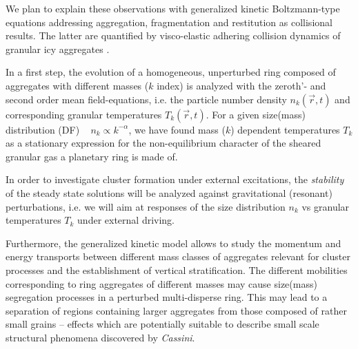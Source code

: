 \documentclass[11pt, notitlepage]{article} %
\begin{document}
We plan to explain these observations with generalized kinetic Boltzmann-type equations addressing aggregation, fragmentation and 
restitution \citep{spahn2004} as collisional results. The latter are quantified by visco-elastic adhering collision dynamics of 
granular icy aggregates \citep{brilliantov2007a}.

In a first step, the evolution of a homogeneous, unperturbed ring composed of aggregates with different masses ($k$ index) is 
analyzed with the zeroth'- and second order mean field-equations, i.e.  the particle number density $n_k (\vec r, t)$ and 
corresponding granular temperatures $T_k (\vec r, t)$. For a given size(mass) distribution (DF) ~ $n_k  \propto k^{-\alpha}$, 
we have found mass ($k$) dependent temperatures $T_k $ as a stationary expression for the non-equilibrium character of the sheared 
granular gas a planetary ring is made of.

In order to investigate cluster formation under external excitations, the \emph{stability} of the steady state solutions will 
be analyzed against gravitational (resonant) perturbations, i.e. we will aim at responses of the size distribution $n_k$ vs 
granular temperatures $T_k$ under external driving.
  
Furthermore, the generalized kinetic model allows to study the momentum and energy transports between different mass 
classes of aggregates relevant for cluster processes and the establishment of vertical stratification.  The different mobilities 
corresponding to ring aggregates of different masses may cause size(mass) segregation processes in a perturbed multi-disperse 
ring. This may lead to a separation of regions containing larger aggregates from those composed of rather small grains -- effects 
which are potentially suitable to describe small scale structural phenomena discovered by \emph{Cassini}.\\
 
\end{document}
